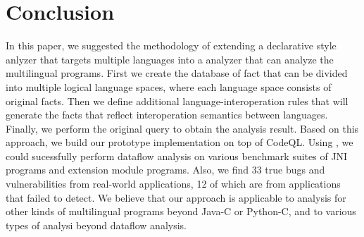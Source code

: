 \section{Conclusion}\label{sec:conclude}
In this paper, we suggested the methodology of extending a declarative style
anlyzer that targets multiple languages into a analyzer that can analyze the
multilingual programs. First we create the database of fact that can be divided
into multiple logical language spaces, where each language space consists of
original facts. Then we define additional language-interoperation rules that
will generate the facts that reflect interoperation semantics between languages.
Finally, we perform the original query to obtain the analysis result.
Based on this approach, we build our prototype implementation \ours on top of
CodeQL.  Using \ours, we could sucessfully perform dataflow analysis on various
benchmark suites of JNI programs and extension module programs.  Also, we find
33 true bugs and vulnerabilities from real-world applications, 12 of which are
from applications that \lees failed to detect.  We believe that our approach is
applicable to analysis for other kinds of multilingual programs beyond Java-C
or Python-C, and to various types of analysi beyond dataflow analysis.
